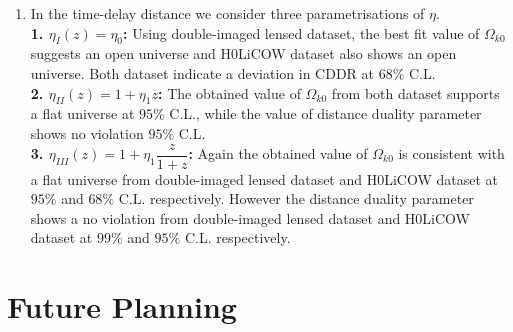 \documentclass[12pt]{report}
\begin{document}
\begin{enumerate}
\item
In the time-delay distance we consider three parametrisations of $\eta$. \\
\textbf{1. $\eta_I(z)=\eta_0$:} Using double-imaged lensed dataset, the best fit value of $\Omega_{k0}$ suggests an open universe and H0LiCOW dataset also shows an open universe. Both dataset indicate a deviation in CDDR at $68\%$ C.L.\\
 \textbf{2. $\eta_{II}(z)=1+\eta_1z$:} The obtained value of  $\Omega_{k0}$ from both dataset supports a flat universe at $95\%$ C.L., while the value of distance duality parameter shows no violation $95\%$ C.L.\\
  \textbf{ 3. $\eta_{III}(z)=1+\eta_1\dfrac{z}{1+z}$:} Again the obtained value of $\Omega_{k0}$  is consistent with a flat universe from double-imaged lensed dataset and H0LiCOW dataset at $95\%$ and $68\%$ C.L. respectively. However the distance duality parameter shows a no violation from double-imaged lensed dataset and H0LiCOW dataset at $99\%$ and $95\%$ C.L. respectively.




\end{enumerate}
\chapter{Future Planning}
\end{document}
